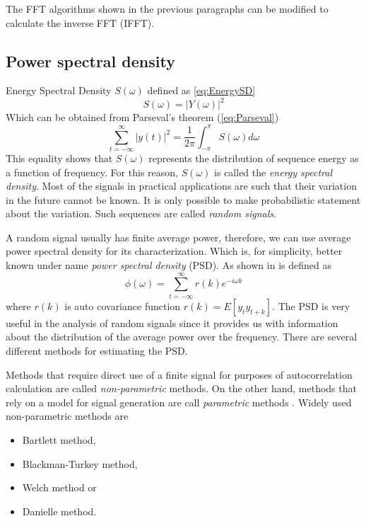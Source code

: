 \documentclass[twoside]{ctuthesis}
\theoremstyle{plain}
\theoremstyle{definition}
\theoremstyle{note}
\begin{document}
The FFT algorithms shown in the previous paragraphs can be modified to calculate the inverse FFT (IFFT).

\subsection{Power spectral density}
\label{sec:PSD}
Energy Spectral Density $S(\omega)$ defined as \ref{eq:EnergySD}
\begin{equation} \label{eq:EnergySD}
	S(\omega)=\left|Y(\omega)\right|^2
\end{equation}
Which can be obtained from Parseval's theorem (\ref{eq:Parseval})
\begin{equation} \label{eq:Parseval}
	\sum_{t=-\infty}^{\infty}\left|y(t)\right|^2 = \frac{1}{2\pi}\int_{-\pi}^{\pi}S(\omega)d\omega
\end{equation}
This equality shows that $S(\omega)$ represents the distribution of sequence energy as a function of frequency. For this reason, $S(\omega)$ is called the \textit{energy spectral density}. 
Most of the signals in practical applications are such that their variation in the future cannot be known. It is only possible to make probabilistic statement about the variation. Such sequences are called \textit{random signals}. 

A random signal usually has finite average power, therefore, we can use average power spectral density for its characterization. Which is, for simplicity, better known under name \textit{power spectral density} (PSD). As shown in \cite{cite:SAoS} is defined as
\begin{equation} \label{eq:PSD1}
	\phi(\omega) = \sum_{t=-\infty}^{\infty}r(k)e^{-i\omega k}
\end{equation}
where $r(k)$ is auto covariance function $r(k) = E[y_{t}y_{t+k}]$.
The PSD is very useful in the analysis of random signals since it provides us with information about the distribution of the average power over the frequency. There are several different methods for estimating the PSD. 

Methods that require direct use of a finite signal for purposes of autocorrelation calculation are called \textit{non-parametric} methods. On the other hand, methods that rely on a model for signal generation are call \textit{parametric} methods \cite{cite:RT_DSP}. Widely used non-parametric methods are

\begin{itemize}
	\setlength{\itemsep}{5pt}
	\item Bartlett method,
	\item Blackman-Turkey method,
	\item Welch method or
	\item Danielle method.
\end{itemize}
\end{document}
